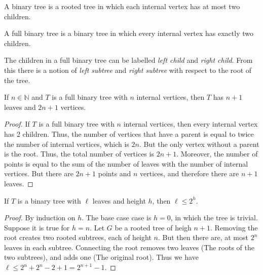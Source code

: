             \begin{definition}
                A binary tree is a rooted tree in which each internal
                vertex has at most two children.
            \end{definition}
            \begin{definition}
                A full binary tree is a binary tree in which every
                internal vertex has exactly two children.
            \end{definition}
            The children in a full binary tree can be labelled
            \textit{left child} and \textit{right child}. From this there is a
            notion of \textit{left subtree} and \textit{right subtree} with
            respect to the root of the tree.
            \begin{theorem}
                If $n\in\mathbb{N}$ and $T$ is a full binary tree with
                $n$ internal vertices,
                then $T$ has $n+1$ leaves and $2n+1$ vertices.
            \end{theorem}
            \begin{proof}
                If $T$ is a full binary tree with $n$ internal vertices,
                then every internal vertex has 2 children. Thus, the
                number of vertices that have a parent is equal to twice
                the number of internal vertices, which is $2n$. But the
                only vertex without a parent is the root. Thus, the
                total number of vertices is $2n+1$. Moreover, the number
                of points is equal to the sum of the number of leaves
                with the number of internal vertices. But there are
                $2n+1$ points and $n$ vertices, and therefore there
                are $n+1$ leaves.
            \end{proof}
            \begin{theorem}
                If $T$ is a binary tree with $\ell$ leaves and height
                $h$, then $\ell\leq2^{h}$.
            \end{theorem}
            \begin{proof}
                By induction on $h$. The base case case is $h=0$, in
                which the tree is trivial. Suppose it is true for
                $h=n$. Let $G$ be a rooted tree of heigh $n+1$.
                Removing the root creates two rooted subtrees,
                each of height $n$. But then there are, at most
                $2^{n}$ leaves in each subtree. Connecting the root
                removes two leaves (The roots of the two subtrees),
                and adds one (The original root). Thus we have
                $\ell\leq{2^{n}+2^{n}-2+1}=2^{n+1}-1$.
            \end{proof}

